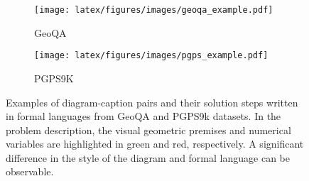 \begin{figure}
    \centering
    \begin{subfigure}[t]{.49\linewidth}
        \centering
        \texttt{[image: latex/figures/images/geoqa\_example.pdf]}
        \caption{GeoQA}
        \label{fig:geoqa_example}
    \end{subfigure}
    \begin{subfigure}[t]{.48\linewidth}
        \centering
        \texttt{[image: latex/figures/images/pgps\_example.pdf]}
        \caption{PGPS9K}
        \label{fig:pgps9k_example}
    \end{subfigure}
    \caption{
    Examples of diagram-caption pairs and their solution steps written in formal languages from GeoQA and PGPS9k datasets. In the problem description, the visual geometric premises and numerical variables are highlighted in green and red, respectively. A significant difference in the style of the diagram and formal language can be observable. %
    \label{fig:pgps_examples}
    }
\end{figure}


